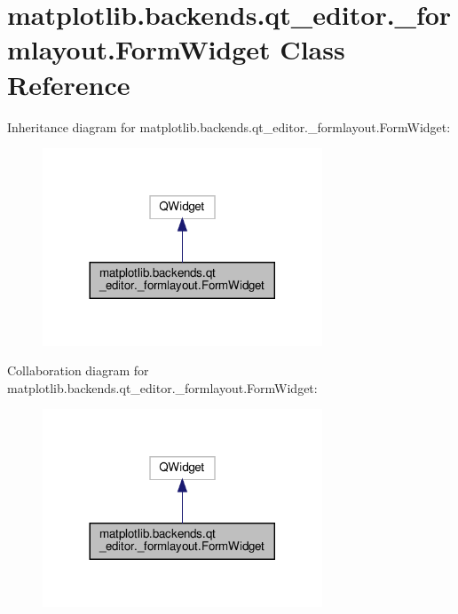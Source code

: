 \hypertarget{classmatplotlib_1_1backends_1_1qt__editor_1_1__formlayout_1_1FormWidget}{}\section{matplotlib.\+backends.\+qt\+\_\+editor.\+\_\+formlayout.\+Form\+Widget Class Reference}
\label{classmatplotlib_1_1backends_1_1qt__editor_1_1__formlayout_1_1FormWidget}


Inheritance diagram for matplotlib.\+backends.\+qt\+\_\+editor.\+\_\+formlayout.\+Form\+Widget\+:
\nopagebreak
\begin{figure}[H]
\begin{center}
\leavevmode
\includegraphics[width=236pt]{classmatplotlib_1_1backends_1_1qt__editor_1_1__formlayout_1_1FormWidget__inherit__graph}
\end{center}
\end{figure}


Collaboration diagram for matplotlib.\+backends.\+qt\+\_\+editor.\+\_\+formlayout.\+Form\+Widget\+:
\nopagebreak
\begin{figure}[H]
\begin{center}
\leavevmode
\includegraphics[width=236pt]{classmatplotlib_1_1backends_1_1qt__editor_1_1__formlayout_1_1FormWidget__coll__graph}
\end{center}
\end{figure}
